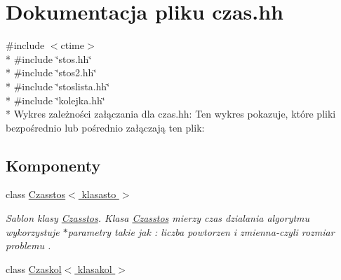 \hypertarget{czas_8hh}{\section{Dokumentacja pliku czas.\-hh}
\label{czas_8hh}
}
{\ttfamily \#include $<$ctime$>$}\\*
{\ttfamily \#include \char`\"{}stos.\-hh\char`\"{}}\\*
{\ttfamily \#include \char`\"{}stos2.\-hh\char`\"{}}\\*
{\ttfamily \#include \char`\"{}stoslista.\-hh\char`\"{}}\\*
{\ttfamily \#include \char`\"{}kolejka.\-hh\char`\"{}}\\*
Wykres zależności załączania dla czas.\-hh\-:
Ten wykres pokazuje, które pliki bezpośrednio lub pośrednio załączają ten plik\-:
\subsection*{Komponenty}
\begin{DoxyCompactItemize}
\item 
class \hyperlink{class_czasstos}{Czasstos$<$ klasasto $>$}
\begin{DoxyCompactList}\small\item\em Sablon klasy \hyperlink{class_czasstos}{Czasstos}. Klasa \hyperlink{class_czasstos}{Czasstos} mierzy czas dzialania algorytmu wykorzystuje $\ast$parametry takie jak \-: liczba powtorzen i zmienna-\/czyli rozmiar problemu . \end{DoxyCompactList}\item 
class \hyperlink{class_czaskol}{Czaskol$<$ klasakol $>$}
\end{DoxyCompactItemize}
